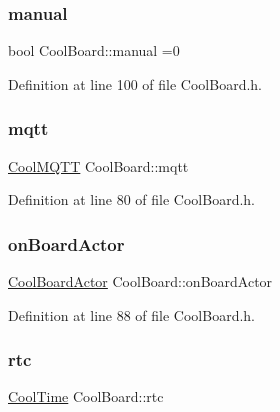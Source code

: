 \subsubsection{\texorpdfstring{manual}{manual}}
{\footnotesize\ttfamily bool Cool\+Board\+::manual =0\hspace{0.3cm}{\ttfamily [private]}}



Definition at line 100 of file Cool\+Board.\+h.

\mbox{\label{class_cool_board_a2399f44d7c23c1149a335cb3b46d90f1}} 
\subsubsection{\texorpdfstring{mqtt}{mqtt}}
{\footnotesize\ttfamily \hyperlink{class_cool_m_q_t_t}{Cool\+M\+Q\+TT} Cool\+Board\+::mqtt\hspace{0.3cm}{\ttfamily [private]}}



Definition at line 80 of file Cool\+Board.\+h.

\mbox{\label{class_cool_board_a4ac693895c21025b8808653f2a4316e6}} 
\subsubsection{\texorpdfstring{on\+Board\+Actor}{onBoardActor}}
{\footnotesize\ttfamily \hyperlink{class_cool_board_actor}{Cool\+Board\+Actor} Cool\+Board\+::on\+Board\+Actor\hspace{0.3cm}{\ttfamily [private]}}



Definition at line 88 of file Cool\+Board.\+h.

\mbox{\label{class_cool_board_a50d2a6716879d64a85f3c6b44ad63275}} 
\subsubsection{\texorpdfstring{rtc}{rtc}}
{\footnotesize\ttfamily \hyperlink{class_cool_time}{Cool\+Time} Cool\+Board\+::rtc\hspace{0.3cm}{\ttfamily [private]}}



